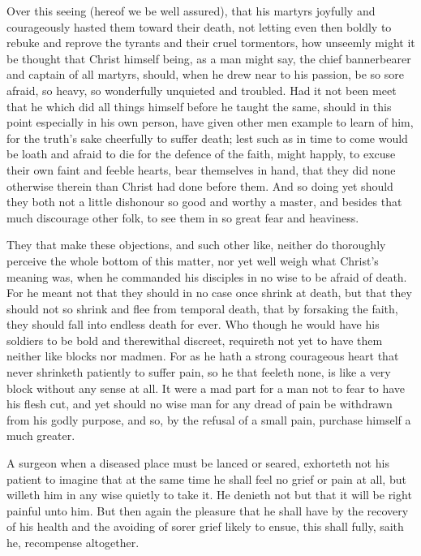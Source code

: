 \documentclass[a5paper]{scrbook}
\begin{document}
	Over this seeing (hereof we be well assured), that his martyrs joyfully and courageously hasted them toward their death, not letting even then boldly to rebuke and reprove the tyrants and their cruel tormentors, how unseemly might it be thought that Christ himself being, as a man might say, the chief bannerbearer and captain of all martyrs, should, when he drew near to his passion, be so sore afraid, so heavy, so wonderfully unquieted and troubled. Had it not been meet that he which did all things himself before he taught the same, should in this point especially in his own person, have given other men example to learn of him, for the truth's sake cheerfully to suffer death; lest such as in time to come would be loath and afraid to die for the defence of the faith, might happly, to excuse their own faint and feeble hearts, bear themselves in hand, that they did none otherwise therein than Christ had done before them. And so doing yet should they both not a little dishonour so good and worthy a master, and besides that much discourage other folk, to see them in so great fear and heaviness.
	
	They that make these objections, and such other like, neither do thoroughly perceive the whole bottom of this matter, nor yet well weigh what Christ's meaning was, when he commanded his disciples in no wise to be afraid of death. For he meant not that they should in no case once shrink at death, but that they should not so shrink and flee from temporal death, that by forsaking the faith, they should fall into endless death for ever. Who though he would have his soldiers to be bold and therewithal discreet, requireth not yet to have them neither like blocks nor madmen. For as he hath a strong courageous heart that never shrinketh patiently to suffer pain, so he that feeleth none, is like a very block without any sense at all. It were a mad part for a man not to fear to have his flesh cut, and yet should no wise man for any dread of pain be withdrawn from his godly purpose, and so, by the refusal of a small pain, purchase himself a much greater.
	
	A surgeon when a diseased place must be lanced or seared, exhorteth not his patient to imagine that at the same time he shall feel no grief or pain at all, but willeth him in any wise quietly to take it. He denieth not but that it will be right painful unto him. But then again the pleasure that he shall have by the recovery of his health and the avoiding of sorer grief likely to ensue, this shall fully, saith he, recompense altogether.
	
\end{document}
